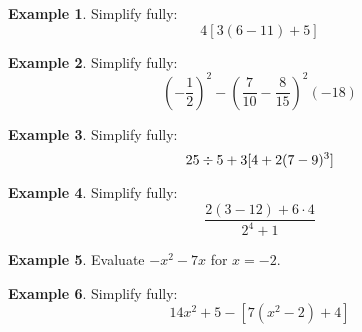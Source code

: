 \documentclass[addpoints,12pt]{exam}
\theoremstyle{definition}
\newtheorem{example}{Example}[subsection]
\begin{document}
\begin{example}
Simplify fully: \[4[3(6-11)+5]\]
\end{example}

\newpage

\begin{example}
Simplify fully: \[\left(-\dfrac{1}{2}\right)^2 - \left(\dfrac{7}{10}-\dfrac{8}{15}\right)^2(-18)\]
\vspace{3in}
\end{example}

\begin{example}
Simplify fully: \[25\divisionsymbol 5 + 3[4+2(7-9)^3]\]
\end{example}

\newpage

\begin{example}
Simplify fully: \[\dfrac{2(3-12)+6\cdot 4}{2^4+1}\]
\vspace{2.5in}
\end{example}

\begin{example}
Evaluate $-x^2-7x$ for $x = -2$.
\vspace{1.5in}
\end{example}

\begin{example}
Simplify fully: \[14x^2+5 - [7(x^2-2)+4]\]
\end{example}
\end{document}
